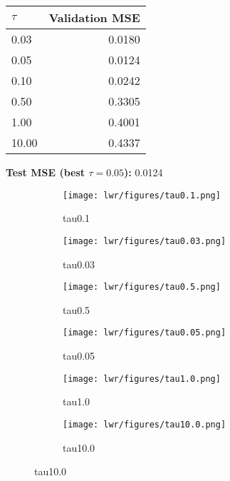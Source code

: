 \begin{answer}

\begin{center}
\begin{tabular}{@{}lr@{}}
\toprule
$\tau$ & \textbf{Validation MSE} \\
\midrule
0.03  & 0.0180 \\
0.05  & 0.0124 \\
0.10  & 0.0242 \\
0.50  & 0.3305 \\
1.00  & 0.4001 \\
10.00 & 0.4337 \\
\bottomrule
\end{tabular}
\end{center}

\medskip
\textbf{Test MSE (best $\tau{=}0.05$):} 0.0124

\begin{figure}[htbp]
  \centering
  \begin{subfigure}[t]{0.30\textwidth}
    \centering
    \texttt{[image: lwr/figures/tau0.1.png]}
    \caption{tau0.1}
  \end{subfigure}\hfill
  \begin{subfigure}[t]{0.30\textwidth}
    \centering
    \texttt{[image: lwr/figures/tau0.03.png]}
    \caption{tau0.03}
  \end{subfigure}\hfill
  \begin{subfigure}[t]{0.30\textwidth}
    \centering
    \texttt{[image: lwr/figures/tau0.5.png]}
    \caption{tau0.5}
  \end{subfigure}

  \vspace{0.8em} %

  \begin{subfigure}[t]{0.30\textwidth}
    \centering
    \texttt{[image: lwr/figures/tau0.05.png]}
    \caption{tau0.05}
  \end{subfigure}\hfill
  \begin{subfigure}[t]{0.30\textwidth}
    \centering
    \texttt{[image: lwr/figures/tau1.0.png]}
    \caption{tau1.0}
  \end{subfigure}\hfill
  \begin{subfigure}[t]{0.30\textwidth}
    \centering
    \texttt{[image: lwr/figures/tau10.0.png]}
    \caption{tau10.0}
  \end{subfigure}


\end{figure}
\end{answer}
